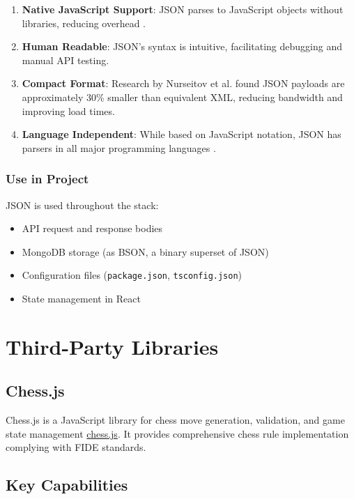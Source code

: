 \begin{enumerate}
    \item \textbf{Native JavaScript Support}: JSON parses to JavaScript objects without libraries, reducing overhead \cite{nurseitov2009json}.
    \item \textbf{Human Readable}: JSON's syntax is intuitive, facilitating debugging and manual API testing.
    \item \textbf{Compact Format}: Research by Nurseitov et al. \cite{nurseitov2009json} found JSON payloads are approximately 30\% smaller than equivalent XML, reducing bandwidth and improving load times.
    \item \textbf{Language Independent}: While based on JavaScript notation, JSON has parsers in all major programming languages \cite{ecma2017json}.
\end{enumerate}

\subsubsection*{Use in Project}

JSON is used throughout the stack:
\begin{itemize}
    \item API request and response bodies
    \item MongoDB storage (as BSON, a binary superset of JSON)
    \item Configuration files (\texttt{package.json}, \texttt{tsconfig.json})
    \item State management in React
\end{itemize}

\section{Third-Party Libraries}

\subsection*{Chess.js}

Chess.js is a JavaScript library for chess move generation, validation, and game state management \href{https://github.com/jhlywa/chess.js}{chess.js}. It provides comprehensive chess rule implementation complying with FIDE standards.

\subsection*{Key Capabilities}

